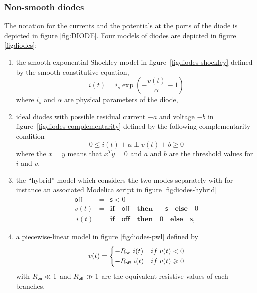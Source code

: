 \subsubsection{Non-smooth  diodes}  The notation for the currents and the potentials at the ports of the diode is depicted in figure \ref{fig:DIODE}. Four models of diodes are depicted in figure \ref{figdiodes}:
\begin{enumerate}
\item the smooth exponential Shockley model in figure~\ref{figdiodes-shockley} defined by the smooth constitutive equation,
  \begin{equation}
    \label{eq:diode-shockley}
     i(t) = i_s \exp(- \frac{v(t)}{\alpha} - 1)
  \end{equation}
where $i_s$ and $\alpha$ are physical parameters of the diode,
\item ideal diodes with possible residual current $-a$ and voltage $-b$ in figure~\ref{figdiodes-complementarity} defined by the following complementarity condition
  \begin{equation}
    \label{eq:diode-complementarity}
     0\leq i(t)+a \perp v(t)+b \geq 0 
  \end{equation}
where the $x \perp y $ means that $x^T y =0$ and $a$ and $b$ are the threshold values for $i$ and $v$,
\item the ``hybrid'' model which considers the two modes separately with for instance  an associated Modelica\cite{} script in figure \ref{figdiodes-hybrid}
  \begin{equation}
    \label{eq:diode-hybrid}
    \begin{array}{cll}
          \mathsf{off} &=& \mathsf{s} < 0 \\
          v(t)  &=& \mathbf{if}\quad \mathsf{off} \quad \mathbf{then}\quad \mathsf{-s} \quad \mathbf{else} \quad 0 \\
          \ i(t) &=& \mathbf{if}\quad \mathsf{off} \quad
          \mathbf{then}\quad 0  \quad \mathbf{else}\quad \mathsf{s},
        \end{array} 
  \end{equation}
\item a piecewise-linear model in figure \ref{figdiodes-pwl} defined by
  \begin{equation}
    \label{eq:diode-pwl}
    v(t)=\begin{cases}-R_\on\; i(t) & \mbox{if}\;v(t) < 0 \\   -R_\off\; i(t) & \mbox{if}\;v(t) \geq  0 \\ \end{cases}
  \end{equation}
with $R_\on \ll 1 $ and $ R_\off \gg 1 $ are the  equivalent resistive values of each branches.
\end{enumerate}

